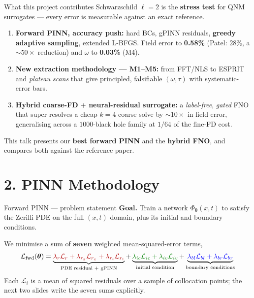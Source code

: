 \documentclass[aspectratio=169, 11pt]{beamer}
\newcommand{\bh}{black hole}
\newcommand{\qnm}{QNM}
\newcommand{\fno}{FNO}
\newcommand{\zer}{Zerilli}
\begin{document}
\begin{frame}{What this project contributes}
  Schwarzschild $\ell\!=\!2$ is the \textbf{stress test} for \qnm{} surrogates ---
  every error is measurable against an exact reference.
  \medskip
  \begin{enumerate}
    \item \textbf{Forward PINN, accuracy push:} hard BCs, gPINN residuals,
          \textbf{greedy adaptive sampling}, extended L-BFGS.
          Field error to \textbf{0.58\%} (Patel: $28\%$, a $\sim\!50\times$ reduction)
          and $\omega$ to \textbf{0.03\%} (M4).
    \medskip
    \item \textbf{New extraction methodology --- M1--M5:} from FFT/NLS to
          ESPRIT and \emph{plateau scans} that give principled, falsifiable
          $(\omega,\tau)$ with systematic-error bars.
    \medskip
    \item \textbf{Hybrid coarse-FD $+$ neural-residual surrogate:} a
          \emph{label-free}, \emph{gated} \fno{} that super-resolves a cheap
          $k\!=\!4$ coarse solve by $\sim\!10\times$ in field error, generalising
          across a $1000$-\bh{} family at $1/64$ of the fine-FD cost.
  \end{enumerate}
  \medskip
  \footnotesize This talk presents our \textbf{best forward PINN} and the
  \textbf{hybrid FNO}, and compares both against the reference paper.
\end{frame}


\section{2. PINN Methodology}

\begin{frame}{Forward PINN --- problem statement}
  \textbf{Goal.} Train a network $\Phi_{\boldsymbol{\theta}}(x,t)$ to satisfy the
  \zer{} PDE on the full $(x,t)$ domain, plus its initial and boundary conditions.
  \bigskip

  We minimise a sum of \textbf{seven} weighted mean-squared-error terms,
  \[
    \mathcal{L}_{\text{fwd}}(\boldsymbol{\theta})
    =
    \underbrace{\textcolor{darkred}{\lambda_{r}\mathcal{L}_{r}
      + \lambda_{r_x}\mathcal{L}_{r_x}
      + \lambda_{r_t}\mathcal{L}_{r_t}}}_{\text{PDE residual + gPINN}}
    +
    \underbrace{\textcolor{darkgreen}{\lambda_{ic}\mathcal{L}_{ic}
      + \lambda_{iv}\mathcal{L}_{iv}}}_{\text{initial condition}}
    +
    \underbrace{\textcolor{blue}{\lambda_{bl}\mathcal{L}_{bl}
      + \lambda_{br}\mathcal{L}_{br}}}_{\text{boundary conditions}}
  \]
  \bigskip
  Each $\mathcal{L}_i$ is a mean of squared residuals over a sample of
  collocation points; the next two slides write the seven sums explicitly.
\end{frame}
\end{document}
